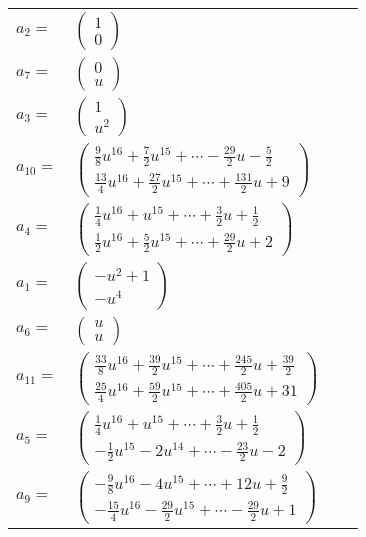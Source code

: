 \documentclass[1p]{elsarticle_modified}
\theoremstyle{definition}
\begin{document}
\begin{tabular}{m{7pt} m{180pt} m{7pt} m{180pt} }
\flushright $a_{2}=$&$\begin{pmatrix}1\\0\end{pmatrix}$ \\
\flushright $a_{7}=$&$\begin{pmatrix}0\\u\end{pmatrix}$ \\
\flushright $a_{3}=$&$\begin{pmatrix}1\\u^2\end{pmatrix}$ \\
\flushright $a_{10}=$&$\begin{pmatrix}\frac{9}{8} u^{16}+\frac{7}{2} u^{15}+\cdots-\frac{29}{2} u-\frac{5}{2}\\\frac{13}{4} u^{16}+\frac{27}{2} u^{15}+\cdots+\frac{131}{2} u+9\end{pmatrix}$ \\
\flushright $a_{4}=$&$\begin{pmatrix}\frac{1}{4} u^{16}+u^{15}+\cdots+\frac{3}{2} u+\frac{1}{2}\\\frac{1}{2} u^{16}+\frac{5}{2} u^{15}+\cdots+\frac{29}{2} u+2\end{pmatrix}$ \\
\flushright $a_{1}=$&$\begin{pmatrix}- u^2+1\\- u^4\end{pmatrix}$ \\
\flushright $a_{6}=$&$\begin{pmatrix}u\\u\end{pmatrix}$ \\
\flushright $a_{11}=$&$\begin{pmatrix}\frac{33}{8} u^{16}+\frac{39}{2} u^{15}+\cdots+\frac{245}{2} u+\frac{39}{2}\\\frac{25}{4} u^{16}+\frac{59}{2} u^{15}+\cdots+\frac{405}{2} u+31\end{pmatrix}$ \\
\flushright $a_{5}=$&$\begin{pmatrix}\frac{1}{4} u^{16}+u^{15}+\cdots+\frac{3}{2} u+\frac{1}{2}\\-\frac{1}{2} u^{15}-2 u^{14}+\cdots-\frac{23}{2} u-2\end{pmatrix}$ \\
\flushright $a_{9}=$&$\begin{pmatrix}-\frac{9}{8} u^{16}-4 u^{15}+\cdots+12 u+\frac{9}{2}\\-\frac{15}{4} u^{16}-\frac{29}{2} u^{15}+\cdots-\frac{29}{2} u+1\end{pmatrix}$ \\

\end{tabular}
\end{document}
